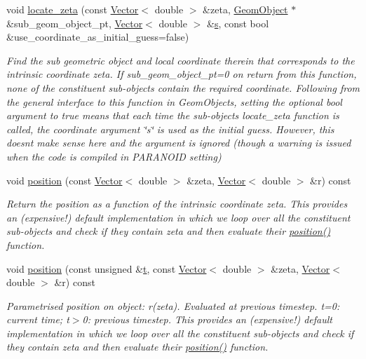 \begin{DoxyCompactItemize}
void \hyperlink{classoomph_1_1MeshAsGeomObject_a8a9fecb98d4e0a151e3b9e58aa433be9}{locate\+\_\+zeta} (const \hyperlink{classoomph_1_1Vector}{Vector}$<$ double $>$ \&zeta, \hyperlink{classoomph_1_1GeomObject}{Geom\+Object} $\ast$\&sub\+\_\+geom\+\_\+object\+\_\+pt, \hyperlink{classoomph_1_1Vector}{Vector}$<$ double $>$ \&\hyperlink{cfortran_8h_ab7123126e4885ef647dd9c6e3807a21c}{s}, const bool \&use\+\_\+coordinate\+\_\+as\+\_\+initial\+\_\+guess=false)
\begin{DoxyCompactList}\small\item\em Find the sub geometric object and local coordinate therein that corresponds to the intrinsic coordinate zeta. If sub\+\_\+geom\+\_\+object\+\_\+pt=0 on return from this function, none of the constituent sub-\/objects contain the required coordinate. Following from the general interface to this function in Geom\+Objects, setting the optional bool argument to true means that each time the sub-\/object\textquotesingle{}s locate\+\_\+zeta function is called, the coordinate argument \char`\"{}s\char`\"{} is used as the initial guess. However, this doesn\textquotesingle{}t make sense here and the argument is ignored (though a warning is issued when the code is compiled in P\+A\+R\+A\+N\+O\+ID setting) \end{DoxyCompactList}\item 
void \hyperlink{classoomph_1_1MeshAsGeomObject_ad071793f5cee36eef0e56dbeeebf4c24}{position} (const \hyperlink{classoomph_1_1Vector}{Vector}$<$ double $>$ \&zeta, \hyperlink{classoomph_1_1Vector}{Vector}$<$ double $>$ \&r) const
\begin{DoxyCompactList}\small\item\em Return the position as a function of the intrinsic coordinate zeta. This provides an (expensive!) default implementation in which we loop over all the constituent sub-\/objects and check if they contain zeta and then evaluate their \hyperlink{classoomph_1_1MeshAsGeomObject_ad071793f5cee36eef0e56dbeeebf4c24}{position()} function. \end{DoxyCompactList}\item 
void \hyperlink{classoomph_1_1MeshAsGeomObject_aab712c9f8a51d997c13c00eb1afaf9f4}{position} (const unsigned \&\hyperlink{cfortran_8h_af6f0bd3dc13317f895c91323c25c2b8f}{t}, const \hyperlink{classoomph_1_1Vector}{Vector}$<$ double $>$ \&zeta, \hyperlink{classoomph_1_1Vector}{Vector}$<$ double $>$ \&r) const
\begin{DoxyCompactList}\small\item\em Parametrised position on object\+: r(zeta). Evaluated at previous timestep. t=0\+: current time; t$>$0\+: previous timestep. This provides an (expensive!) default implementation in which we loop over all the constituent sub-\/objects and check if they contain zeta and then evaluate their \hyperlink{classoomph_1_1MeshAsGeomObject_ad071793f5cee36eef0e56dbeeebf4c24}{position()} function. \end{DoxyCompactList}\item 

\end{DoxyCompactItemize}
